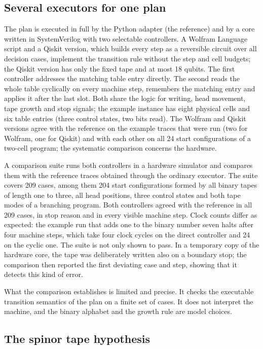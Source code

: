 \subsection{Several executors for one plan}

The plan is executed in full by the Python adapter (the reference) and by a core written in SystemVerilog with two selectable
controllers. A Wolfram Language script and a Qiskit version, which builds every step as a reversible circuit over all decision cases,
implement the transition rule without the step and cell budgets; the Qiskit version has only the fixed tape and at most 18 qubits. The first controller addresses the
matching table entry directly. The second reads the whole table cyclically on every machine step, remembers the matching entry and applies
it after the last slot. Both share the logic for writing, head movement, tape growth and stop signals; the example instance has eight physical cells and six
table entries (three control states, two bits read). The Wolfram and Qiskit versions agree with the reference on the example traces that were run (two for Wolfram, one for Qiskit) and
with each other on all 24 start configurations of a two-cell program; the systematic comparison concerns the hardware.

A comparison suite runs both controllers in a hardware simulator and compares them with the reference traces obtained through the
ordinary executor. The suite covers 209 cases, among them 204 start configurations formed by all binary tapes of length one to three,
all head positions, three control states and both tape modes of a branching program. Both controllers agreed with the reference in all
209 cases, in stop reason and in every visible machine step. Clock counts differ as expected: the example run that adds one to the
binary number seven halts after four machine steps, which take four clock cycles on the direct controller and 24 on the cyclic one.
The suite is not only shown to pass. In a temporary copy of the hardware core, the tape was deliberately written also on a
\textsf{boundary} stop; the comparison then reported the first deviating case and step, showing that it detects this kind of error.

What the comparison establishes is limited and precise. It checks the executable transition semantics of the plan on a finite set of
cases. It does not interpret the machine, and the binary alphabet and the growth rule are model choices.

\subsection{The spinor tape hypothesis}

